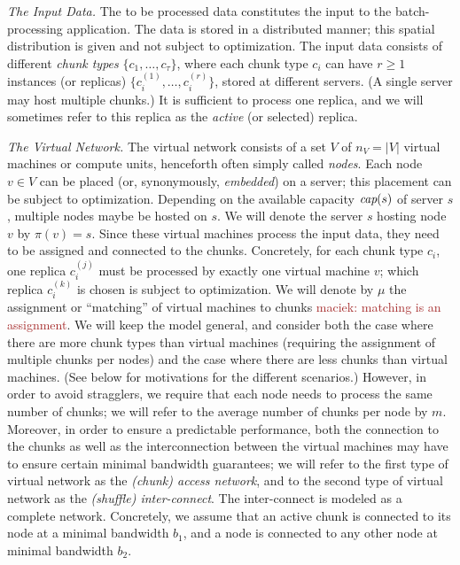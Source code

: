 \documentclass[9pt]{sigcomm-alternate}
\newcommand{\maciek}[1]{\textcolor{brown}{maciek: #1}}
\newcommand{\MaFactor}{m}
\newcommand{\ChunkType}{\tau}
\newcommand{\VirtualNodes}{\ensuremath{V}}
\newcommand{\achunk}{\ensuremath{c}}
\newcommand{\capacity}{\emph{cap}}
\newcommand{\CostTrans}{\ensuremath{b_1}}
\newcommand{\CostCom}{\ensuremath{b_2}}
\begin{document}
\emph{The Input Data.} The to be processed data constitutes the input to the batch-processing application.
The data is stored in a distributed manner; this spatial distribution is given and not subject to optimization.
The input data consists of different \emph{chunk types} $\{\achunk_1, \ldots, \achunk_{\ChunkType}\}$,
where each chunk type $\achunk_i$ can have $r\geq 1$ instances (or replicas) $\{\achunk_{i}^{(1)},\ldots, \achunk_{i}^{(r)}\}$,
 stored at different servers. (A single server may host multiple chunks.)
It is sufficient to process one replica, and we will sometimes refer to this
replica as the \emph{active} (or selected) replica.

\emph{The Virtual Network.} The virtual network consists of a set $\VirtualNodes$ of $n_V=|\VirtualNodes|$ virtual machines or compute
 units, henceforth often simply called \emph{nodes}.
Each node $v \in \VirtualNodes$ can be placed (or, synonymously, \emph{embedded}) on a server; this placement can be subject
to optimization.
Depending on the available capacity $\capacity(s)$ of server $s$, multiple nodes maybe be hosted on $s$.
We will denote the server $s$ hosting node $v$ by $\pi(v)=s$.
Since these virtual machines process the input data, they need to be assigned and connected to the
chunks. Concretely, for each chunk type $\achunk_i$, one replica $\achunk_{i}^{(j)}$ must be processed by exactly one virtual machine $v$;
which replica $\achunk_{i}^{(k)}$ is chosen is subject to optimization.
We will denote by $\mu$ the assignment or ``matching'' of virtual
machines to chunks \maciek{matching is an assignment}.
We will keep the model general, and consider both the case where there are more chunk types
than virtual machines (requiring the assignment of multiple chunks per nodes) and the case
where there are less chunks than virtual machines. (See below for motivations for the different scenarios.)
However, in order to avoid stragglers, we require that each node needs to process the same number of chunks;
we will refer to the average number of chunks per node by $\MaFactor$.
Moreover, in order to ensure a predictable performance, both the connection to the chunks
as well as the interconnection between the virtual machines may have to ensure certain
minimal bandwidth guarantees; we will refer to the first type of virtual network as the \emph{(chunk) access
network}, and to the second type of virtual network as the \emph{(shuffle) inter-connect}. The inter-connect
is modeled as a complete network. Concretely, we assume that an  active chunk
is connected to its node at a minimal bandwidth $\CostTrans$, and a node is connected to any other node
at minimal bandwidth $\CostCom$.
\end{document}
